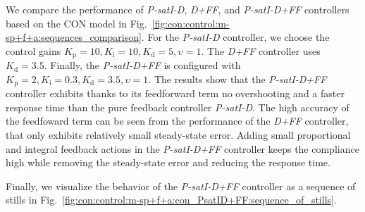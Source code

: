 We compare the performance of \emph{P-satI-D}, \emph{D+FF}, and \emph{P-satI-D+FF} controllers based on the \gls{CON} model in Fig.~\ref{fig:con:control:m-sp+f+a:sequences_comparison}.
For the \emph{P-satI-D} controller, we choose the control gains $K_\mathrm{p} = 10, K_\mathrm{i}=10, K_\mathrm{d} = \num{5}, \upsilon = 1$. The \emph{D+FF} controller uses $K_\mathrm{d} = \num{3.5}$. Finally, the \emph{P-satI-D+FF} is configured with $K_\mathrm{p} = 2, K_\mathrm{i}=0.3, K_\mathrm{d} = \num{3.5}, \upsilon = 1$.
The results show that the \emph{P-satI-D+FF} controller exhibits thanks to its feedforward term no overshooting and a faster response time than the pure feedback controller \emph{P-satI-D}. The high accuracy of the feedfoward term can be seen from the performance of the \emph{D+FF} controller, that only exhibits relatively small steady-state error. Adding small proportional and integral feedback actions in the \emph{P-satI-D+FF} controller keeps the compliance high while removing the steady-state error and reducing the response time.

Finally, we visualize the behavior of the \emph{P-satI-D+FF} controller as a sequence of stills in Fig.~\ref{fig:con:control:m-sp+f+a:con_PsatID+FF:sequence_of_stills}.



